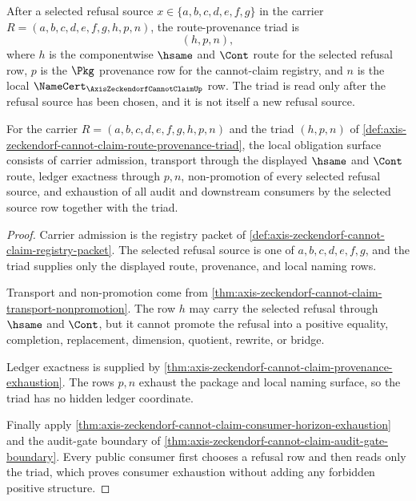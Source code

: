 \begin{definition}
\label{def:axis-zeckendorf-cannot-claim-route-provenance-triad}
After a selected refusal source $x\in\{a,b,c,d,e,f,g\}$ in the carrier $R=(a,b,c,d,e,f,g,h,p,n)$, the route-provenance triad is
$$
(h,p,n),
$$
where $h$ is the componentwise $\hsame$ and $\Cont$ route for the selected refusal row, $p$ is the $\Pkg$ provenance row for the cannot-claim registry, and $n$ is the local $\NameCert_{\AxisZeckendorfCannotClaimUp}$ row. The triad is read only after the refusal source has been chosen, and it is not itself a new refusal source.
\end{definition}

\begin{theorem}
\label{thm:axis-zeckendorf-cannot-claim-route-provenance-triad-obligations}
For the carrier $R=(a,b,c,d,e,f,g,h,p,n)$ and the triad $(h,p,n)$ of \autoref{def:axis-zeckendorf-cannot-claim-route-provenance-triad}, the local obligation surface consists of carrier admission, transport through the displayed $\hsame$ and $\Cont$ route, ledger exactness through $p,n$, non-promotion of every selected refusal source, and exhaustion of all audit and downstream consumers by the selected source row together with the triad.
\end{theorem}
\begin{proof}
Carrier admission is the registry packet of \autoref{def:axis-zeckendorf-cannot-claim-registry-packet}. The selected refusal source is one of $a,b,c,d,e,f,g$, and the triad supplies only the displayed route, provenance, and local naming rows.

Transport and non-promotion come from \autoref{thm:axis-zeckendorf-cannot-claim-transport-nonpromotion}. The row $h$ may carry the selected refusal through $\hsame$ and $\Cont$, but it cannot promote the refusal into a positive equality, completion, replacement, dimension, quotient, rewrite, or bridge.

Ledger exactness is supplied by \autoref{thm:axis-zeckendorf-cannot-claim-provenance-exhaustion}. The rows $p,n$ exhaust the package and local naming surface, so the triad has no hidden ledger coordinate.

Finally apply \autoref{thm:axis-zeckendorf-cannot-claim-consumer-horizon-exhaustion} and the audit-gate boundary of \autoref{thm:axis-zeckendorf-cannot-claim-audit-gate-boundary}. Every public consumer first chooses a refusal row and then reads only the triad, which proves consumer exhaustion without adding any forbidden positive structure.
\end{proof}

